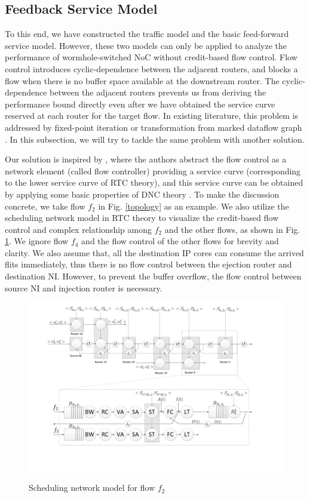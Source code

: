 \documentclass[preprint]{elsarticle}
\begin{document}
\subsection{Feedback Service Model}\label{flowcontrol}
To this end, we have constructed the traffic model and the basic feed-forward service model. However, these two models can only be applied to analyze the performance of wormhole-switched NoC without credit-based flow control. Flow control introduces cyclic-dependence between the adjacent routers, and blocks a flow when there is no buffer space available at the downstream router. The cyclic-dependence between the adjacent routers prevents us from deriving the performance bound directly even after we have obtained the service curve reserved at each router for the target flow. In existing literature, this problem is addressed by fixed-point iteration \cite{schioler2005network} or transformation from marked dataflow graph \cite{Thiele:2009:MPA:1629335.1629353}. In this subsection, we will try to tackle the same problem with another solution.

Our solution is inspired by \cite{qian2009analysis}, where the authors abstract the flow control as a network element (called flow controller) providing a service curve (corresponding to the lower service curve of RTC theory), and this service curve can be obtained by applying some basic properties of DNC theory \cite{Boudec2001Network}. To make the discussion concrete, we take flow $f_2$ in Fig. \ref{topology} as an example. We also utilize the scheduling network model \cite{1253607} in RTC theory to visualize the credit-based flow control and complex relationship among $f_2$ and the other flows, as shown in Fig. \ref{f2}. We ignore flow $f_4$ and the flow control of the other flows for brevity and clarity. We also assume that, all the destination IP cores can consume the arrived flits immediately, thus there is no flow control between the ejection router and destination NI. However, to prevent the buffer overflow, the flow control between source NI and injection router is necessary.
\begin{figure}
  \centering
  \includegraphics[scale=0.35]{figures/f2.pdf}\\
  \caption{Scheduling network model for flow $f_2$}\label{f2}
\end{figure}
\end{document}
